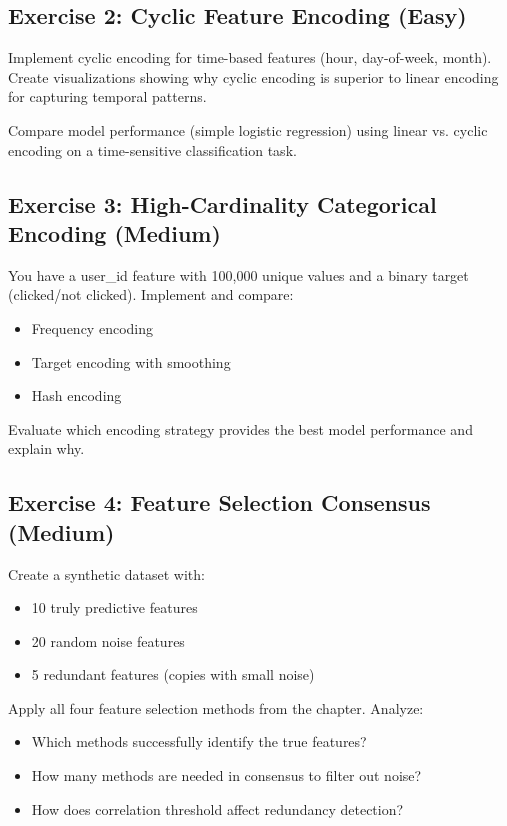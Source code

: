 \subsection{Exercise 2: Cyclic Feature Encoding (Easy)}

Implement cyclic encoding for time-based features (hour, day-of-week, month). Create visualizations showing why cyclic encoding is superior to linear encoding for capturing temporal patterns.

Compare model performance (simple logistic regression) using linear vs. cyclic encoding on a time-sensitive classification task.

\subsection{Exercise 3: High-Cardinality Categorical Encoding (Medium)}

You have a user\_id feature with 100,000 unique values and a binary target (clicked/not clicked). Implement and compare:
\begin{itemize}
    \item Frequency encoding
    \item Target encoding with smoothing
    \item Hash encoding
\end{itemize}

Evaluate which encoding strategy provides the best model performance and explain why.

\subsection{Exercise 4: Feature Selection Consensus (Medium)}

Create a synthetic dataset with:
\begin{itemize}
    \item 10 truly predictive features
    \item 20 random noise features
    \item 5 redundant features (copies with small noise)
\end{itemize}

Apply all four feature selection methods from the chapter. Analyze:
\begin{itemize}
    \item Which methods successfully identify the true features?
    \item How many methods are needed in consensus to filter out noise?
    \item How does correlation threshold affect redundancy detection?
\end{itemize}

